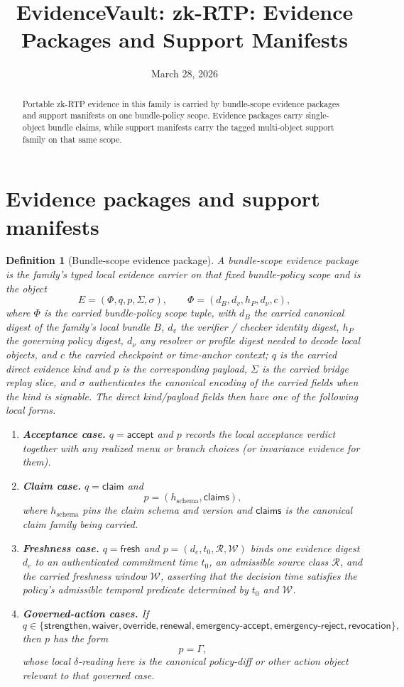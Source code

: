 \documentclass[11pt]{article}
\title{EvidenceVault: zk-RTP: Evidence Packages and Support Manifests}
\author{}
\date{March 28, 2026}
\newtheorem{definition}{Definition}
\begin{document}
\maketitle

\begin{abstract}
Portable zk-RTP evidence in this family is carried by bundle-scope evidence packages and support manifests on one bundle-policy scope.
Evidence packages carry single-object bundle claims, while support manifests carry the tagged multi-object support family on that same scope.
\end{abstract}

\section{Evidence packages and support manifests}

\begin{definition}[Bundle-scope evidence package]
A bundle-scope evidence package is the family's typed local evidence carrier on that fixed bundle-policy scope and is the object
\[
E=(\Phi,q,p,\Sigma,\sigma),
\qquad
\Phi=(d_B,d_v,h_P,d_\nu,c),
\]
where $\Phi$ is the carried bundle-policy scope tuple, with $d_B$ the carried canonical digest of the family's local bundle $B$, $d_v$ the verifier / checker identity digest, $h_P$ the governing policy digest, $d_\nu$ any resolver or profile digest needed to decode local objects, and $c$ the carried checkpoint or time-anchor context; $q$ is the carried direct evidence kind and $p$ is the corresponding payload, $\Sigma$ is the carried bridge replay slice, and $\sigma$ authenticates the canonical encoding of the carried fields when the kind is signable.
The direct kind/payload fields then have one of the following local forms.
\begin{enumerate}[label=\textnormal{(\alph*)},leftmargin=2em]
\item \textbf{Acceptance case.} $q=\mathsf{accept}$ and $p$ records the local acceptance verdict together with any realized menu or branch choices (or invariance evidence for them).
\item \textbf{Claim case.} $q=\mathsf{claim}$ and
\[
p=(h_{\mathrm{schema}},\mathsf{claims}),
\]
where $h_{\mathrm{schema}}$ pins the claim schema and version and $\mathsf{claims}$ is the canonical claim family being carried.
\item \textbf{Freshness case.} $q=\mathsf{fresh}$ and $p=(d_e,t_0,\mathcal{R},\mathcal{W})$ binds one evidence digest $d_e$ to an authenticated commitment time $t_0$, an admissible source class $\mathcal{R}$, and the carried freshness window $\mathcal{W}$, asserting that the decision time satisfies the policy's admissible temporal predicate determined by $t_0$ and $\mathcal{W}$.
\item \textbf{Governed-action cases.} If
\[
q\in\{\mathsf{strengthen},\mathsf{waiver},\mathsf{override},\mathsf{renewal},\textsf{emergency-accept},\textsf{emergency-reject},\mathsf{revocation}\},
\]
then $p$ has the form
\[
p=\Gamma,
\]
whose local $\delta$-reading here is the canonical policy-diff or other action object relevant to that governed case.
\end{enumerate}
\end{definition}
\end{document}
